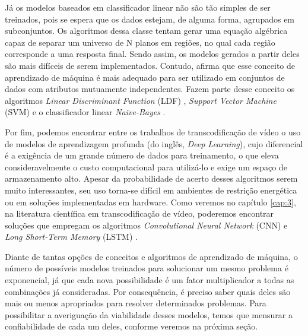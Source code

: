 Já os modelos baseados em classificador linear não são tão simples de ser treinados, pois se espera que os dados estejam, de alguma forma, agrupados em subconjuntos. Os algoritmos dessa classe tentam gerar uma equação algébrica capaz de separar um universo de N planos em regiões, no qual cada região corresponde a uma resposta final. Sendo assim, os modelos gerados a partir deles são mais difíceis de serem implementados. Contudo, \citet{bib:livroKubat} afirma que esse conceito de aprendizado de máquina é mais adequado para ser utilizado em conjuntos de dados com atributos mutuamente independentes. Fazem parte desse conceito os algoritmos \textit{Linear Discriminant Function} (LDF) \cite{bib:shumway_1974}, \textit{Support Vector Machine} (SVM) \cite{bib:hearst_1998} e o classificador linear \textit{Naïve-Bayes} \cite{bib:lewis_1998}.

Por fim, podemos encontrar entre os trabalhos de transcodificação de vídeo o uso de modelos de aprendizagem profunda (do inglês, \textit{Deep Learning}), cujo diferencial é a exigência de um grande número de dados para treinamento, o que eleva consideravelmente o custo computacional para utilizá-lo e exige um espaço de armazenamento alto. Apesar da probabilidade de acerto desses algoritmos serem muito interessantes, seu uso torna-se difícil em ambientes de restrição energética ou em soluções implementadas em hardware. Como veremos no capítulo \ref{cap:3}, na literatura científica em transcodificação de vídeo, poderemos encontrar soluções que empregam os algoritmos \textit{Convolutional Neural Network} (CNN) \cite{bib:koushik_2016} e \textit{Long Short-Term Memory} (LSTM) \cite{bib:graves_2012}.

Diante de tantas opções de conceitos e algoritmos de aprendizado de máquina, o número de possíveis modelos treinados para solucionar um mesmo problema é exponencial, já que cada nova possibilidade é um fator multiplicador a todas as combinações já consideradas. Por consequência, é preciso saber quais deles são mais ou menos apropriados para resolver determinados problemas. Para possibilitar a averiguação da viabilidade desses modelos, temos que mensurar a confiabilidade de cada um deles, conforme veremos na próxima seção.
